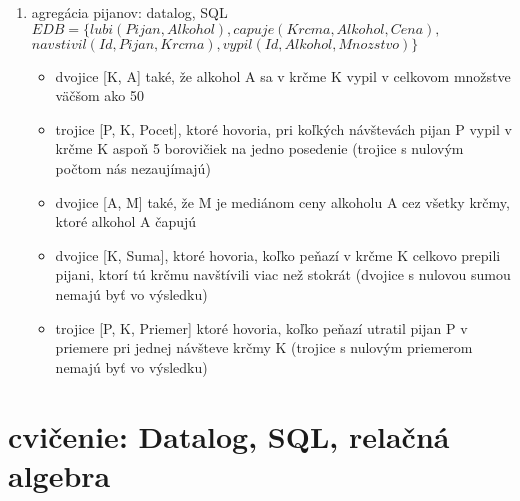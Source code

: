 \documentclass[10pt, a4paper]{article}
\begin{document}
\begin{enumerate}
\item agregácia pijanov: datalog, SQL
$EDB=\{lubi(Pijan, Alkohol), capuje(Krcma, Alkohol, Cena),$\\
\hspace*{1cm} $navstivil(Id, Pijan, Krcma), vypil(Id, Alkohol, Mnozstvo)\}$
\begin{itemize}
    \item dvojice [K, A] také, že alkohol A sa v krčme K vypil v celkovom množstve väčšom ako 50
    \item trojice [P, K, Pocet], ktoré hovoria, pri koľkých návštevách pijan P vypil v krčme K aspoň 5 borovičiek na jedno posedenie (trojice s nulovým počtom nás nezaujímajú)
    \item dvojice [A, M] také, že M je mediánom ceny alkoholu A cez všetky krčmy, ktoré alkohol A čapujú
    \item dvojice [K, Suma], ktoré hovoria, koľko peňazí v krčme K celkovo prepili pijani, ktorí tú krčmu navštívili viac než stokrát (dvojice s nulovou sumou nemajú byť vo výsledku)
    \item trojice [P, K, Priemer] ktoré hovoria, koľko peňazí utratil pijan P v priemere pri jednej návšteve krčmy K (trojice s nulovým priemerom nemajú byť vo výsledku)
\end{itemize}

\end{enumerate}


\newpage

\section{cvičenie: Datalog, SQL, relačná algebra}
\end{document}
